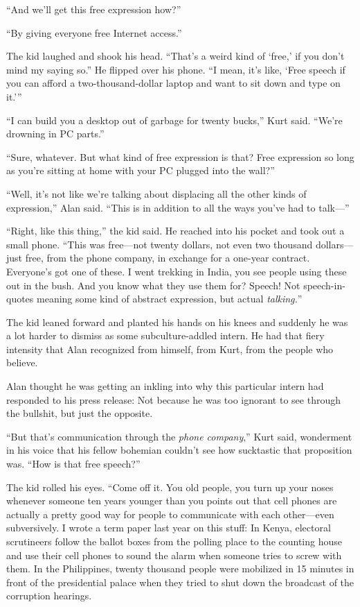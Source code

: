 \documentclass{article}
\begin{document}
``And we'll get this free expression how?''

``By giving everyone free Internet access.''

The kid laughed and shook his head.  ``That's a weird kind of `free,'
if you don't mind my saying so.'' He flipped over his phone.  ``I
mean, it's like, `Free speech if you can afford a two-thousand-dollar
laptop and want to sit down and type on it.'''

``I can build you a desktop out of garbage for twenty bucks,'' Kurt
said.  ``We're drowning in PC parts.''

``Sure, whatever.  But what kind of free expression is that?  Free
expression so long as you're sitting at home with your PC plugged into
the wall?''

``Well, it's not like we're talking about displacing all the other
kinds of expression,'' Alan said.  ``This is in addition to all the
ways you've had to talk---''

``Right, like this thing,'' the kid said.  He reached into his pocket
and took out a small phone.  ``This was free---not twenty dollars, not
even two thousand dollars---just free, from the phone company, in
exchange for a one-year contract.  Everyone's got one of these.  I
went trekking in India, you see people using these out in the bush. 
And you know what they use them for?  Speech!  Not speech-in-quotes
meaning some kind of abstract expression, but actual
\textit{talking.}''

The kid leaned forward and planted his hands on his knees and suddenly
he was a lot harder to dismiss as some subculture-addled intern.  He
had that fiery intensity that Alan recognized from himself, from Kurt,
from the people who believe.

Alan thought he was getting an inkling into why this particular intern
had responded to his press release:  Not because he was too ignorant
to see through the bullshit, but just the opposite.

``But that's communication through the \textit{phone company},'' Kurt
said, wonderment in his voice that his fellow bohemian couldn't see
how sucktastic that proposition was.  ``How is that free speech?''

The kid rolled his eyes.  ``Come off it.  You old people, you turn up
your noses whenever someone ten years younger than you points out that
cell phones are actually a pretty good way for people to communicate
with each other---even subversively.  I wrote a term paper last year
on this stuff:  In Kenya, electoral scrutineers follow the ballot
boxes from the polling place to the counting house and use their cell
phones to sound the alarm when someone tries to screw with them.  In
the Philippines, twenty thousand people were mobilized in 15 minutes
in front of the presidential palace when they tried to shut down the
broadcast of the corruption hearings.
\end{document}
